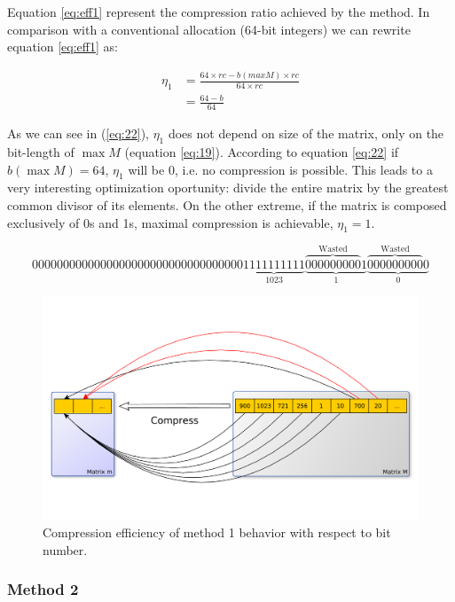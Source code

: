 \documentclass[10pt]{article}
\begin{document}
Equation \ref{eq:eff1} represent the compression ratio achieved by the method. In comparison with a conventional allocation (64-bit integers) we can rewrite equation \ref{eq:eff1} as:

\begin{align}\label{eq:22}
 \eta_1 &= \frac{64 \times rc - b(max M) \times rc}{64 \times rc}\nonumber\\
 &= \frac{64  - b }{64}
\end{align}

As we can see in (\ref{eq:22}), $\eta_1$ does not depend on size of the matrix, only on the bit-length of $\max M$ (equation \ref{eq:19}). According to equation \ref{eq:22} if $b(\max M)=64$, $\eta_1$ will be 0, i.e. no compression is possible. This leads to a very interesting optimization oportunity: divide the entire matrix by the greatest common divisor  of its elements. On the other extreme, if the matrix is composed exclusively of 0s and 1s, maximal compression is achievable, $\eta_1=1$.

\begin{equation} \label{eq:19}
 0000000000000000000000000000000000\underbrace{1111111111}_{1023}\underbrace{\overbrace{000000000}^{\text{Wasted}}1}_{1}\underbrace{\overbrace{000000000}^{\text{Wasted}}0}_{0}
\end{equation}

\begin{figure}[h]
 \centering
 \includegraphics[scale=0.5]{fig01}
 \caption{Compression efficiency of method 1 behavior with respect to bit number.}
 \label{fig:01}
\end{figure}
 
 \subsubsection*{Method 2}
 
\end{document}
